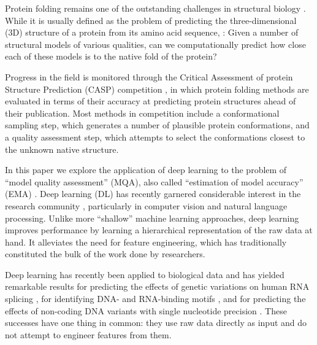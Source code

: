 
Protein folding remains one of the outstanding challenges in
structural biology \cite{dill2012folding}. While it is usually defined
as the problem of predicting the three-dimensional (3D) structure of a
protein from its amino acid sequence, :
Given a number of structural models of various
qualities, can we computationally predict how close each of these
models is to the native fold of the protein?

Progress in the field is monitored through the Critical Assessment of
protein Structure Prediction (CASP) competition \cite{moult1995large},
in which protein folding methods are evaluated in terms of their
accuracy at predicting protein structures ahead of their
publication. Most methods in competition include a conformational
sampling step, which generates a number of plausible protein
conformations, and a quality assessment step, which attempts to select
the conformations closest to the unknown native structure.

In this paper we explore the application of deep learning to the
problem of ``model quality assessment'' (MQA), also called
``estimation of model accuracy'' (EMA) \cite{kryshtafovych2015}. Deep
learning (DL) has recently garnered considerable interest in the
research community \cite{lecun2015deep}, particularly in computer
vision and natural language processing. Unlike more ``shallow''
machine learning approaches, deep learning improves performance by
learning a hierarchical representation of the raw data at hand. It
alleviates the need for feature engineering, which has traditionally
constituted the bulk of the work done by researchers.

Deep learning has recently been applied to biological data and has
yielded remarkable results for predicting the effects of genetic
variations on human RNA splicing \cite{xiong2015human}, for
identifying DNA- and RNA-binding
motifs \cite{alipanahi2015predicting}, and for predicting the effects
of non-coding DNA variants with single nucleotide
precision \cite{zhou2015predicting}. These successes have one thing in
common: they use raw data directly as input and do not attempt to
engineer features from them.


